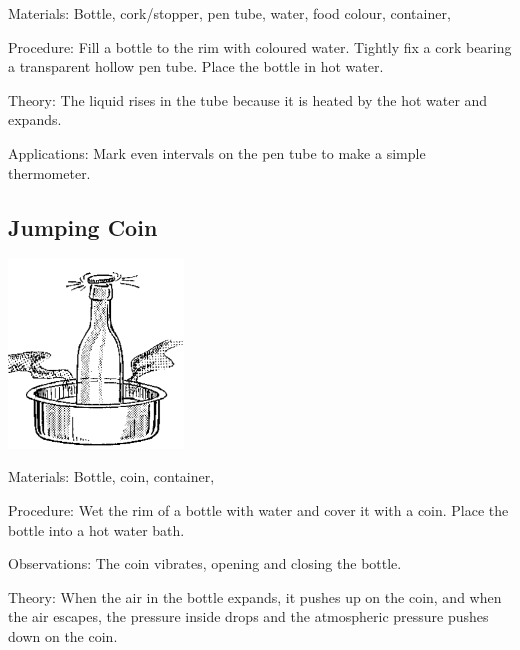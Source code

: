 \begin{multicols}{2}
\begin{description*}
\item[Materials:]{Bottle, cork/stopper, pen tube, water, food colour, container, }
\item[Procedure:]{Fill a bottle to the rim with coloured water. Tightly fix a cork bearing a transparent hollow pen tube. Place the bottle in hot water.}
\item[Theory:]{The liquid rises in the tube because it is heated by the hot water and expands.}
\item[Applications:]{Mark even intervals on the pen tube to make a simple thermometer.}
\end{description*}

\subsection{Jumping Coin}

\begin{center}
\includegraphics[width=0.35\textwidth]{./img/source/jumping-coin.png}
\end{center}

\begin{description*}
\item[Materials:]{Bottle, coin, container, }
\item[Procedure:]{Wet the rim of a bottle with water and cover it with a coin. Place the bottle into a hot water bath.}
\item[Observations:]{The coin vibrates, opening and closing the bottle.}
\item[Theory:]{When the air in the bottle expands, it pushes up on the coin, and when the air escapes, the pressure inside drops and the atmospheric pressure pushes down on the coin.}
\end{description*}


\end{multicols}
